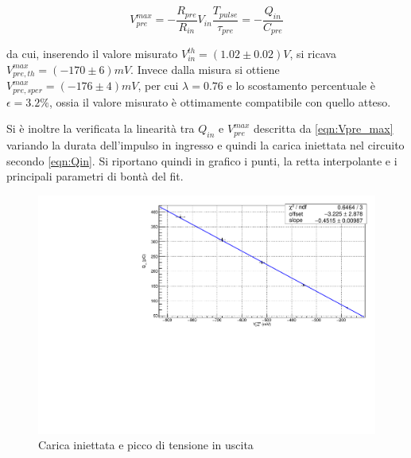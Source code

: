\documentclass{article}
\begin{document}
\begin{equation}
    \label{eqn:Vpre_max}
    V_{pre}^{max} = -\frac{R_{pre}}{R_{in}} V_{in} \frac{T_{pulse}}{\tau_{pre}} = - \frac{Q_{in}}{C_{pre}}
\end{equation}

da cui, inserendo il valore misurato $V_{in}^{th}=(1.02\pm 0.02) V$, si ricava $V_{pre,th}^{max} =  (-170 \pm 6) mV$. Invece dalla 
misura si ottiene $V_{pre,sper}^{max} = (-176 \pm 4) mV$, per cui $\lambda = 0.76$ e lo scostamento percentuale è $\epsilon = 3.2 \%$, 
ossia il valore misurato è ottimamente compatibile con quello atteso.

Si è inoltre la verificata la linearità tra $Q_{in}$ e $V_{pre}^{max}$ descritta da \ref{eqn:Vpre_max} variando la durata dell'impulso
in ingresso e quindi la carica iniettata nel circuito secondo \ref{eqn:Qin}. Si riportano quindi in grafico i punti, la retta 
interpolante e i principali parametri di bontà del fit. 

\begin{center}
\begin{figure}[H]
\centering
\includegraphics[scale=0.4, angle=0]{fitpreamp.pdf}
\caption{Carica iniettata e picco di tensione in uscita}
\label{fig:QinvsVpre}
\end{figure}
\end{center}
\end{document}
